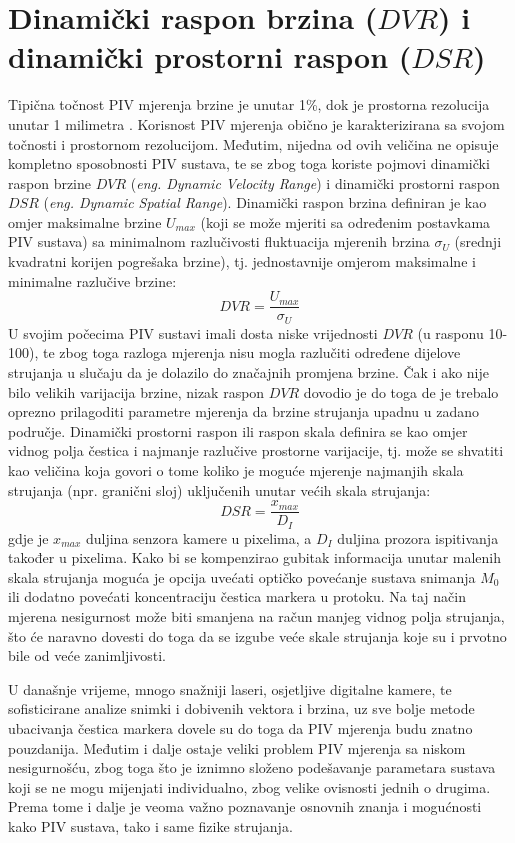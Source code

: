 \section{Dinamički raspon brzina ($DVR$) i dinamički prostorni raspon ($DSR$)}
Tipična točnost PIV mjerenja brzine je unutar 1\%, dok je prostorna rezolucija unutar 1 milimetra \cite{adrian1997dynamic}. Korisnost PIV mjerenja obično je karakterizirana sa svojom točnosti i prostornom rezolucijom. Međutim, nijedna od ovih veličina ne opisuje kompletno sposobnosti PIV sustava, te se zbog toga koriste pojmovi dinamički raspon brzine $DVR$ (\textit{eng. Dynamic Velocity Range}) i dinamički prostorni raspon $DSR$ (\textit{eng. Dynamic Spatial Range}). Dinamički raspon brzina definiran je kao omjer maksimalne brzine $U_{max}$ (koji se može mjeriti sa određenim postavkama PIV sustava) sa minimalnom razlučivosti fluktuacija mjerenih brzina $\sigma_{U}$ (srednji kvadratni korijen pogrešaka brzine), tj. jednostavnije omjerom maksimalne i minimalne razlučive brzine:
\begin{equation}
	DVR=\frac{U_{max}}{\sigma_{U}}
	\label{eqn:4.3}
\end{equation}
U svojim počecima PIV sustavi imali dosta niske vrijednosti $DVR$ (u rasponu 10-100), te zbog toga razloga mjerenja nisu mogla razlučiti određene dijelove strujanja u slučaju da je dolazilo do značajnih promjena brzine. Čak i ako nije bilo velikih varijacija brzine, nizak raspon $DVR$ dovodio je do toga de je trebalo oprezno prilagoditi parametre mjerenja da brzine strujanja upadnu u zadano područje. Dinamički prostorni raspon ili raspon skala definira se kao omjer vidnog polja čestica i najmanje razlučive prostorne varijacije, tj. može se shvatiti kao veličina koja govori o tome koliko je moguće mjerenje najmanjih skala strujanja (npr. granični sloj) uključenih unutar većih skala strujanja:
\begin{equation}
	DSR=\frac{x_{max}}{D_{I}}
	\label{eqn:4.4}
\end{equation} 
gdje je $x_{max}$ duljina senzora kamere u pixelima, a $D_{I}$ duljina prozora ispitivanja također u pixelima. Kako bi se kompenzirao gubitak informacija unutar malenih skala strujanja moguća je opcija uvećati optičko povećanje sustava snimanja $M_{0}$ ili dodatno povećati koncentraciju čestica markera u protoku. Na taj način mjerena nesigurnost može biti smanjena na račun manjeg vidnog polja strujanja, što će naravno dovesti do toga da se izgube veće skale strujanja koje su i prvotno bile od veće zanimljivosti.
\par
U današnje vrijeme, mnogo snažniji laseri, osjetljive digitalne kamere, te sofisticirane analize snimki i dobivenih vektora i brzina, uz sve bolje metode ubacivanja čestica markera dovele su do toga da PIV mjerenja budu znatno pouzdanija. Međutim i dalje ostaje veliki problem PIV mjerenja sa niskom nesigurnošću, zbog toga što je iznimno složeno podešavanje parametara sustava koji se ne mogu mijenjati individualno, zbog velike ovisnosti jednih o drugima. Prema tome i dalje je veoma važno poznavanje osnovnih znanja i mogućnosti kako PIV sustava, tako i same fizike strujanja.
